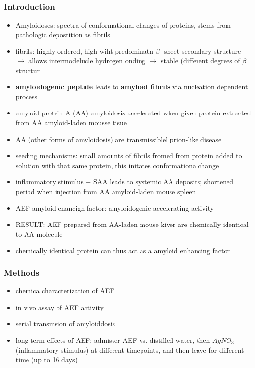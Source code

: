 \documentclass[fleqn]{article}\usepackage{caption}
\begin{document}
\subsubsection{Introduction}
\begin{itemize}
\item Amyloidoses: spectra of conformational changes of proteins, stems from pathologic depostition as fibrils
\item fibrils: highly ordered, high wiht predominatn $ \beta $ -sheet secondary structure $\rightarrow$ allows intermodelucle hydrogen onding $\rightarrow$  stable (different degrees of $ \beta$ structur
\item \textbf{amyloidogenic peptide} leads to \textbf{amyloid fibrils} via nucleation dependent process
\item amyloid protein A (AA) amyloidosis accelerated when given protein extracted from AA amyloid-laden mousse tisue
\item AA (other forms of amyloidosis) are transmissiblel prion-like disease
\item seeding mechanisms: small amounts of fibrils fromed from protein added to solution with that same protein, this initates conformationa change
\item inflammatory stimulus + SAA leads to systemic AA deposits; shortened period when injection from AA amyloid-laden mouse spleen
\item AEF amyloid enancign factor: amyloidogenic accelerating activity
\item RESULT: AEF prepared from AA-laden mouse kiver are chemically identical to AA molecule
\item chemically identical protein can thus act as a amyloid enhancing factor   
\end{itemize}

\subsubsection{Methods}
\begin{itemize}
\item chemica characterization of AEF
\item in vivo assay of AEF activity
\item serial transmsion of amyloiddosis
\item long term effects of AEF: admister AEF vs. distilled water, then $AgNO_3$ (inflammatory stimulus) at different timepoints, and then leave for different time (up to 16 days)
\end{itemize}
\end{document}

